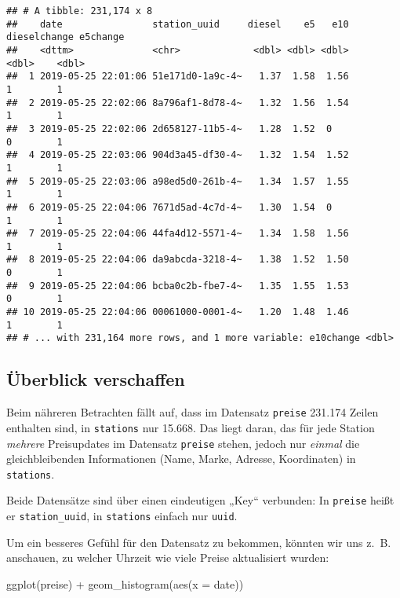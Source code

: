 \documentclass[
  ngerman,
]{article}
\newenvironment{Shaded}{\begin{snugshade}}{\end{snugshade}}
\newcommand{\AttributeTok}[1]{\textcolor[rgb]{0.77,0.63,0.00}{#1}}
\newcommand{\FunctionTok}[1]{\textcolor[rgb]{0.00,0.00,0.00}{#1}}
\newcommand{\NormalTok}[1]{#1}
\newcommand{\SpecialCharTok}[1]{\textcolor[rgb]{0.00,0.00,0.00}{#1}}
\begin{document}
\begin{verbatim}
## # A tibble: 231,174 x 8
##    date                station_uuid     diesel    e5   e10 dieselchange e5change
##    <dttm>              <chr>             <dbl> <dbl> <dbl>        <dbl>    <dbl>
##  1 2019-05-25 22:01:06 51e171d0-1a9c-4~   1.37  1.58  1.56            1        1
##  2 2019-05-25 22:02:06 8a796af1-8d78-4~   1.32  1.56  1.54            1        1
##  3 2019-05-25 22:02:06 2d658127-11b5-4~   1.28  1.52  0               0        1
##  4 2019-05-25 22:03:06 904d3a45-df30-4~   1.32  1.54  1.52            1        1
##  5 2019-05-25 22:03:06 a98ed5d0-261b-4~   1.34  1.57  1.55            1        1
##  6 2019-05-25 22:04:06 7671d5ad-4c7d-4~   1.30  1.54  0               1        1
##  7 2019-05-25 22:04:06 44fa4d12-5571-4~   1.34  1.58  1.56            1        1
##  8 2019-05-25 22:04:06 da9abcda-3218-4~   1.38  1.52  1.50            0        1
##  9 2019-05-25 22:04:06 bcba0c2b-fbe7-4~   1.35  1.55  1.53            0        1
## 10 2019-05-25 22:04:06 00061000-0001-4~   1.20  1.48  1.46            1        1
## # ... with 231,164 more rows, and 1 more variable: e10change <dbl>
\end{verbatim}

\hypertarget{uxfcberblick-verschaffen-1}{%
\subsection{Überblick verschaffen}\label{uxfcberblick-verschaffen-1}}

Beim nähreren Betrachten fällt auf, dass im Datensatz \texttt{preise} 231.174 Zeilen enthalten sind, in \texttt{stations} nur 15.668. Das liegt daran, das für jede Station \emph{mehrere} Preisupdates im Datensatz \texttt{preise} stehen, jedoch nur \emph{einmal} die gleichbleibenden Informationen (Name, Marke, Adresse, Koordinaten) in \texttt{stations}.

Beide Datensätze sind über einen eindeutigen „Key`` verbunden: In \texttt{preise} heißt er \texttt{station\_uuid}, in \texttt{stations} einfach nur \texttt{uuid}.

Um ein besseres Gefühl für den Datensatz zu bekommen, könnten wir uns z.~B. anschauen, zu welcher Uhrzeit wie viele Preise aktualisiert wurden:

\begin{Shaded}
\begin{Highlighting}[]
\FunctionTok{ggplot}\NormalTok{(preise) }\SpecialCharTok{+}
  \FunctionTok{geom\_histogram}\NormalTok{(}\FunctionTok{aes}\NormalTok{(}\AttributeTok{x =}\NormalTok{ date))}
\end{Highlighting}
\end{Shaded}
\end{document}
